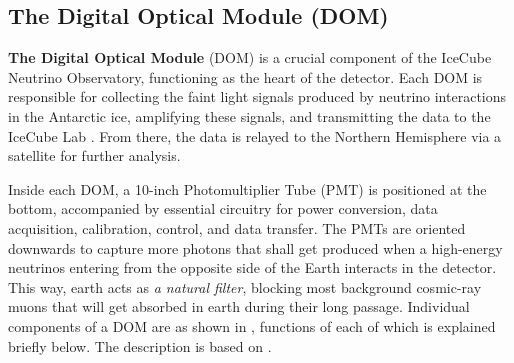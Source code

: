 \subsection{The Digital Optical Module (DOM)}
\label{sec:dom}
\textbf{The Digital Optical Module} (DOM) is a crucial component of the IceCube Neutrino Observatory, functioning as the heart of the detector. Each DOM is responsible for collecting the faint light signals produced by neutrino interactions in the Antarctic ice, amplifying these signals, and transmitting the data to the IceCube Lab \cite{Aartsen_2017}. From there, the data is relayed to the Northern Hemisphere via a satellite for further analysis. 

Inside each DOM, a 10-inch Photomultiplier Tube (PMT) is positioned at the bottom, accompanied by essential circuitry for power conversion, data acquisition, calibration, control, and data transfer. The PMTs are oriented downwards to capture more photons that shall get produced when a high-energy neutrinos entering from the opposite side of the Earth interacts in the detector. This way, earth acts as \emph{a natural filter}, blocking most background cosmic-ray muons that will get absorbed in earth during their long passage. Individual components of a DOM are as shown in , functions of each of which is explained briefly below. The description is based on . 

